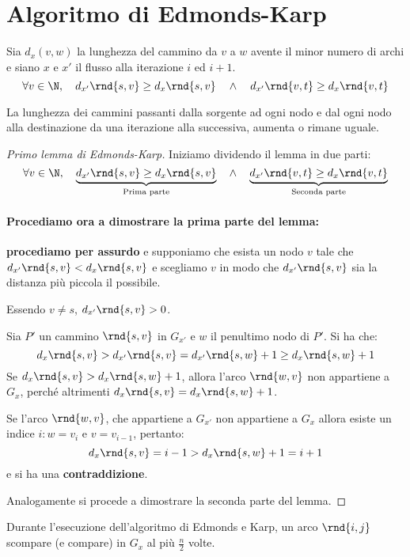 \documentclass[\main/main.tex]{subfiles}
\begin{document}
\section{Algoritmo di Edmonds-Karp}
\begin{lemma}\label{first_lemma_karp}
  Sia \(d_x(v,w)\) la lunghezza del cammino da \(v\) a \(w\) avente il minor numero di archi e siano \(x\) e \(x'\) il flusso alla iterazione \(i\) ed \(i+1\).
  \[
    \forall v \in \N, \quad d_{x'}\rnd{s, v} \geq d_{x}\rnd{s, v} \quad \land \quad d_{x'}\rnd{v, t} \geq d_{x}\rnd{v, t}
  \]

  La lunghezza dei cammini passanti dalla sorgente ad ogni nodo e dal ogni nodo alla destinazione da una iterazione alla successiva, aumenta o rimane uguale.
\end{lemma}
\begin{proof}[Primo lemma di Edmonds-Karp]
  Iniziamo dividendo il lemma in due parti:
  \[
    \forall v \in \N, \quad \underbrace{d_{x'}\rnd{s, v} \geq d_{x}\rnd{s, v}}_{\text{Prima parte}} \quad \land \quad \underbrace{d_{x'}\rnd{v, t} \geq d_{x}\rnd{v, t}}_{\text{Seconda parte}}
  \]
  \paragraph*{Procediamo ora a dimostrare la prima parte del lemma:} \textbf{procediamo per assurdo} e supponiamo che esista un nodo \(v\) tale che \(d_{x'}\rnd{s, v} < d_x\rnd{s, v}\) e scegliamo \(v\) in modo che \(d_{x'}\rnd{s, v}\) sia la distanza più piccola il possibile.

  Essendo \(v \neq s\), \(d_{x'}\rnd{s, v} > 0\).

  Sia \(P'\) un cammino \(\rnd{s, v}\) in \(G_{x'}\) e \(w\) il penultimo nodo di \(P'\). Si ha che:
  \[
    d_{x}\rnd{s, v} > d_{x'}\rnd{s, v} = d_{x'}\rnd{s, w} + 1 \geq d_{x}\rnd{s, w} + 1
  \]
  Se \(d_{x}\rnd{s, v} > d_{x}\rnd{s, w} + 1\), allora l'arco \(\rnd{w, v}\) non appartiene a \(G_x\), perché altrimenti \(d_x\rnd{s, v} = d_x\rnd{s, w}+1\).

  Se l'arco \(\rnd{w, v}\), che appartiene a \(G_{x'}\) non appartiene a \(G_x\) allora esiste un indice \(i: w = v_ i\) e \(v = v_{i-1}\), pertanto:
  \[
    d_{x}\rnd{s, v} = i -1 > d_{x}\rnd{s, w} + 1 = i+1
  \]
  e si ha una \textbf{contraddizione}.

  Analogamente si procede a dimostrare la seconda parte del lemma.
\end{proof}
\begin{lemma}\label{second_lemma_karp}
  Durante l'esecuzione dell'algoritmo di Edmonds e Karp, un arco \(\rnd{i,j}\) scompare (e compare) in \(G_{x}\) al più \(\frac{n}{2}\) volte.
\end{lemma}
\end{document}
